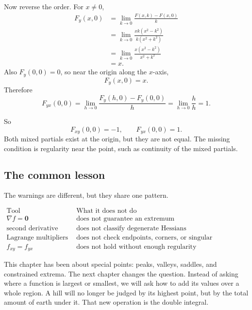 Now reverse the order.  For \(x\ne0\),
\[
\begin{aligned}
F_y(x,0)
&=
\lim_{k\to0}
\frac{F(x,k)-F(x,0)}{k}\\
&=
\lim_{k\to0}
\frac{xk(x^2-k^2)}{k(x^2+k^2)}\\
&=
\lim_{k\to0}
\frac{x(x^2-k^2)}{x^2+k^2}\\
&=
x.
\end{aligned}
\]
Also \(F_y(0,0)=0\), so near the origin along the \(x\)-axis,
\[
    F_y(x,0)=x.
\]
Therefore
\[
    F_{yx}(0,0)
    =
    \lim_{h\to0}
    \frac{F_y(h,0)-F_y(0,0)}{h}
    =
    \lim_{h\to0}
    \frac{h}{h}
    =
    1.
\]

So
\[
\boxed{
    F_{xy}(0,0)=-1,
    \qquad
    F_{yx}(0,0)=1.
}
\]
Both mixed partials exist at the origin, but they are not equal.  The missing condition
is regularity near the point, such as continuity of the mixed partials.

\subsection{The common lesson}

The warnings are different, but they share one pattern.

\[
\begin{array}{c|l}
\text{Tool} & \text{What it does not do}\\ \hline
\nabla f=\mathbf 0 & \text{does not guarantee an extremum}\\[1mm]
\text{second derivative test} & \text{does not classify degenerate Hessians}\\[1mm]
\text{Lagrange multipliers} & \text{does not check endpoints, corners, or singular constraints}\\[1mm]
f_{xy}=f_{yx} & \text{does not hold without enough regularity}
\end{array}
\]

This chapter has been about special points: peaks, valleys, saddles, and constrained
extrema.  The next chapter changes the question.  Instead of asking where a function is
largest or smallest, we will ask how to add its values over a whole region.  A hill will
no longer be judged by its highest point, but by the total amount of earth under it.  That
new operation is the double integral.

